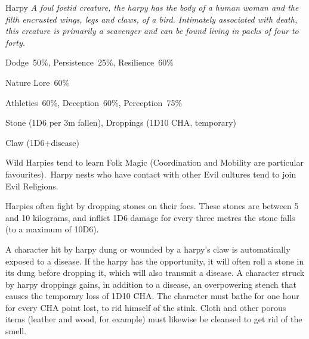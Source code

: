 \begin{monsterbox}{Harpy}
	\textit{A foul foetid creature, the harpy has the body of a human woman and the filth encrusted wings, legs and claws, of a bird. Intimately associated with death, this creature is primarily a scavenger and can be found living in packs of four to forty.}\\
	\rpghline
	\basics[%
        hitpoints  = 9,
	majorwound = 5,
	damagemodifier = 0,
	powerpoints = 11,
	movementrate = {15m, 30m when flying},
	armor = None,
	plunderrating = 3
	]
	\rpghline%
	\stats[ %
		STR = 3D6    (11),
		CON = 3D6    (11),
		DEX = 5D6    (18),
		SIZ = 2D6    (7),
		INT = 3D6    (11),
		POW = 3D6    (11),
		CHA = 1D6    (4)
	]
	\rpghline%
	\begin{rpg-monsteraction}[Resistances]
		Dodge~50\%, Persistence~25\%, Resilience~60\%
	\end{rpg-monsteraction}
	\begin{rpg-monsteraction}[Knowledge]
		Nature Lore~60\%
	\end{rpg-monsteraction}
	\begin{rpg-monsteraction}[Practical]
		Athletics~60\%, Deception~60\%, Perception~75\%
	\end{rpg-monsteraction}
	\begin{rpg-monsteraction}
		Stone (1D6 per 3m fallen), Droppings (1D10 CHA, temporary)
	\end{rpg-monsteraction}
	\begin{rpg-monsteraction}
		Claw (1D6+disease)
	\end{rpg-monsteraction}
	\begin{rpg-monsteraction}
		Wild Harpies tend to learn Folk Magic (Coordination and Mobility are particular favourites). Harpy nests who have contact with other Evil cultures tend to join Evil Religions.
	\end{rpg-monsteraction}
	\begin{rpg-monsteraction}
		Harpies often fight by dropping stones on their foes. These stones are between 5 and 10 kilograms, and inflict 1D6 damage for every three metres the stone falls (to a maximum of 10D6). 
	\end{rpg-monsteraction}
	\begin{rpg-monsteraction}
		A character hit by harpy dung or wounded by a harpy’s claw is automatically exposed to a disease. If the harpy has the opportunity, it will often roll a stone in its dung before dropping it, which will also transmit a disease. A character struck by harpy droppings gains, in addition to a disease, an overpowering stench that causes the temporary loss of 1D10 CHA. The character must bathe for one hour for every CHA point lost, to rid himself of the stink. Cloth and other porous items (leather and wood, for example) must likewise be cleansed to get rid of the smell.

\end{rpg-monsteraction}
\end{monsterbox}

